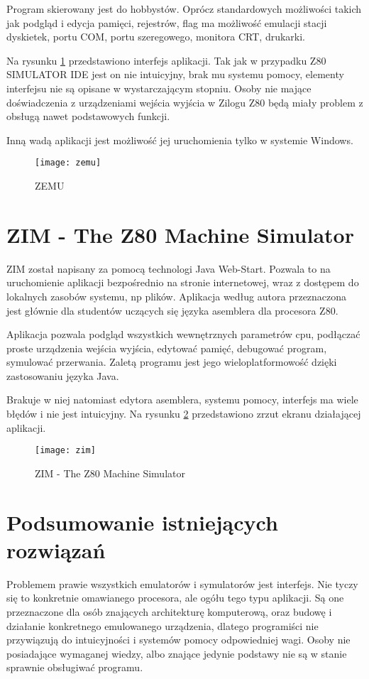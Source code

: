 	Program skierowany jest do hobbystów. Oprócz standardowych możliwości takich jak podgląd i edycja pamięci, rejestrów, flag ma możliwość emulacji stacji dyskietek, portu COM, portu szeregowego, monitora CRT, drukarki.    
	
	Na rysunku \ref{img:zemu} przedstawiono interfejs aplikacji. Tak jak w przypadku Z80 SIMULATOR IDE jest on nie intuicyjny, brak mu systemu pomocy, elementy interfejsu nie są opisane w wystarczającym stopniu. Osoby nie mające doświadczenia z urządzeniami wejścia wyjścia w Zilogu Z80 będą miały problem z obsługą nawet podstawowych funkcji.
	
	Inną wadą aplikacji jest możliwość jej uruchomienia tylko w systemie Windows. 
	
	\begin{figure}[h]		
		\centering
		\texttt{[image: zemu]}
		\caption{ZEMU \cite{zemuImg}}
		\label{img:zemu}
	\end{figure}
	
	 \section{ZIM - The Z80 Machine Simulator}
	ZIM został napisany za pomocą technologi Java Web-Start. Pozwala to na uruchomienie aplikacji bezpośrednio na stronie internetowej, wraz z dostępem do lokalnych zasobów systemu, np plików. \cite{zim}
	Aplikacja według autora \cite{zimPurpose} przeznaczona jest głównie dla studentów uczących się języka asemblera dla procesora Z80.
	
	Aplikacja pozwala podgląd wszystkich wewnętrznych parametrów cpu, podłączać proste urządzenia wejścia wyjścia, edytować pamięć, debugować program, symulować przerwania. Zaletą programu jest jego wieloplatformowość dzięki zastosowaniu języka Java.
	
	Brakuje w niej natomiast edytora asemblera, systemu pomocy, interfejs ma wiele błędów i nie jest intuicyjny. Na rysunku \ref{img:zim} przedstawiono zrzut ekranu działającej aplikacji.
	
	\begin{figure}[h]		
		\centering
		\texttt{[image: zim]}
		\caption{ZIM - The Z80 Machine Simulator \cite{zimImg}}
		\label{img:zim}
	\end{figure}
	
	
	\section{Podsumowanie istniejących rozwiązań}
	Problemem prawie wszystkich emulatorów i symulatorów jest interfejs. Nie tyczy się to konkretnie omawianego procesora, ale ogółu tego typu aplikacji. Są one przeznaczone dla osób znających architekturę komputerową, oraz budowę i działanie konkretnego emulowanego urządzenia, dlatego programiści nie przywiązują do intuicyjności i systemów pomocy odpowiedniej wagi. Osoby nie posiadające wymaganej wiedzy, albo znające jedynie podstawy nie są w stanie sprawnie obsługiwać programu. 
	
